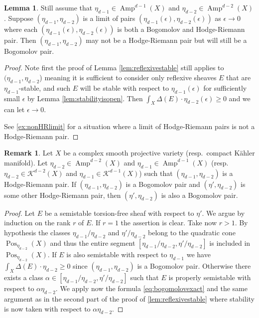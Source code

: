 \documentclass[a4,reqno]{amsart}
\theoremstyle{definition}
\newtheorem{lemma}[theorem]{Lemma}
\newtheorem{remark}[theorem]{Remark}
\def\cK{\mathcal K}
\DeclareMathOperator{\Amp}{Amp}
\DeclareMathOperator{\Pos}{Pos}
\numberwithin{equation}{section}
\begin{document}
\begin{lemma}\label{lem:limitBog}
Still assume that $\eta_{d-1}\in \Amp^{d-1}(X)$ and $\eta_{d-2}\in \Amp^{d-2}(X)$.    Suppose $(\eta_{d-1},\eta_{d-2})$ is a limit of pairs $(\eta_{d-1}(\epsilon),\eta_{d-2}(\epsilon))$ as $\epsilon\to 0$ where each $(\eta_{d-1}(\epsilon),\eta_{d-2}(\epsilon))$ is both a Bogomolov and Hodge-Riemann pair.   Then $(\eta_{d-1},\eta_{d-2})$ may not be a Hodge-Riemann pair but will still be a Bogomolov pair.  
\end{lemma}
\begin{proof}
Note first the proof of Lemma \ref{lem:reflexivestable} still applies to $(\eta_{d-1},\eta_{d-2}$) meaning it is sufficient to consider only reflexive sheaves $E$ that are $\eta_{d-1}$-stable, and such $E$ will be stable with respect to $\eta_{d-1}(\epsilon)$ for sufficiently small $\epsilon$ by Lemma \ref{lem:stabilityisopen}.  Then  $\int_X \Delta(E)\cdot \eta_{d-2}(\epsilon)\ge 0$ and we can let $\epsilon\to 0$.

See \cref{ex:nonHRlimit} for a situation where a limit of Hodge-Riemann pairs is not a Hodge-Riemann pair.
\end{proof}


\begin{remark}\label{rem:OpennessBogomolov}
 Let $X$ be a complex smooth projective variety (resp.\ compact K\"ahler manifold). 
 Let $\eta_{d-2}\in \Amp^{d-2}(X)$ and $\eta_{d-1}\in \Amp^{d-1}(X)$ (resp.\ $\eta_{d-2}\in \cK^{d-2}(X)$ and $\eta_{d-1}\in \cK^{d-1}(X)$) such that $(\eta_{d-1},\eta_{d-2})$ is a Hodge-Riemann pair.
 If $(\eta_{d-1},\eta_{d-2})$ is a Bogomolov pair and  $(\eta',\eta_{d-2})$ is some other Hodge-Riemann pair, then $(\eta',\eta_{d-2})$ is also a Bogomolov pair.
\end{remark}
\begin{proof}
     Let $E$ be a semistable torsion-free sheaf with respect to $\eta'$. We argue by induction on the rank $r$ of $E$. If $r=1$ the assertion is clear. Take now $r>1$. 
    By hypothesis the classes $\eta_{d-1}/\eta_{d-2}$ and $\eta'/\eta_{d-2}$ belong to the quadratic cone $\Pos_{\eta_{d-2}}(X)$ and thus the entire segment $[\eta_{d-1}/\eta_{d-2},\eta'/\eta_{d-2}]$ is included in $\Pos_{\eta_{d-2}}(X)$.
    If $E$ is also semistable with respect to $\eta_{d-1}$ we have  $\int_X \Delta(E)\cdot \eta_{d-2}\ge 0$ since $(\eta_{d-1},\eta_{d-2})$ is a Bogomolov pair. Otherwise there exists a class $\alpha\in[\eta_{d-1}/\eta_{d-2},\eta'/\eta_{d-2}]$ such that  $E$ is properly semistable with respect to $\alpha\eta_{d-2}$. We apply now the formula \eqref{eq:bogomolovexact} and the same argument as in the second part of the proof of  \cref{lem:reflexivestable} where stability is now taken with respect to  $\alpha\eta_{d-2}$.
\end{proof}
\end{document}
